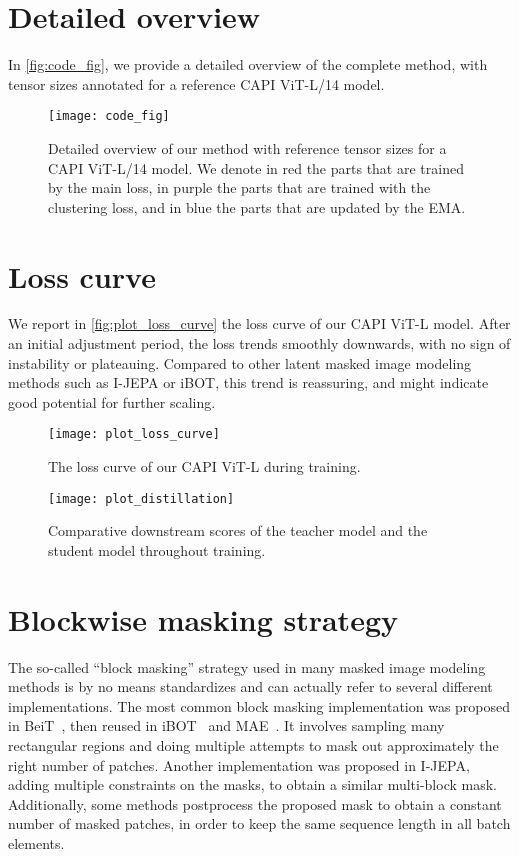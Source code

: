 \clearpage
\appendix

\section{Detailed overview}
In \autoref{fig:code_fig}, we provide a detailed overview of the complete method, with tensor sizes annotated for a reference CAPI ViT-L/14 model.

\begin{figure}[p]
  \centering
  \texttt{[image: code\_fig]}
  \caption{Detailed overview of our method with reference tensor sizes for a CAPI ViT-L/14 model.
  We denote in red the parts that are trained by the main loss, in purple the parts that are trained with the clustering loss, and in blue the parts that are updated by the EMA.}
  \label{fig:code_fig}
\end{figure}

\section{Loss curve}
We report in \autoref{fig:plot_loss_curve} the loss curve of our CAPI ViT-L model.
After an initial adjustment period, the loss trends smoothly downwards, with no sign of instability or plateauing.
Compared to other latent masked image modeling methods such as I-JEPA or iBOT, this trend is reassuring, and might indicate good potential for further scaling.
\begin{figure}
  \centering
  \begin{minipage}{0.49\linewidth}
  \centering
  \texttt{[image: plot\_loss\_curve]}
  \caption{The loss curve of our CAPI ViT-L during training.}
  \label{fig:plot_loss_curve}
  \end{minipage}
  \hfill
  \begin{minipage}{0.49\linewidth}
      \centering
      \texttt{[image: plot\_distillation]}
      \caption{Comparative downstream scores of the teacher model and the student model throughout training.}
      \label{fig:plot_distillation}
  \end{minipage}
  \end{figure}

\section{Blockwise masking strategy}
The so-called ``block masking'' strategy used in many masked image modeling methods is by no means standardizes and can actually refer to several different implementations.
The most common block masking implementation was proposed in BeiT~\citep{beit}, then reused in iBOT~\citep{ibot} and MAE~\citep{he2021masked}.
It involves sampling many rectangular regions and doing multiple attempts to mask out approximately the right number of patches.
Another implementation was proposed in I-JEPA, adding multiple constraints on the masks, to obtain a similar multi-block mask. 
Additionally, some methods postprocess the proposed mask to obtain a constant number of masked patches, in order to keep the same sequence length in all batch elements.

